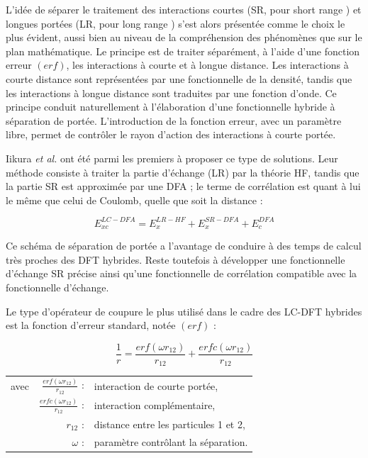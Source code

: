	L'idée de séparer le traitement des interactions courtes (SR, pour \og short range \fg{}) et longues portées (LR, pour \og long range \fg{}) s'est alors présentée comme le choix le plus évident, aussi bien au niveau de la compréhension des phénomènes que sur le plan mathématique. Le principe est de traiter séparément, à l'aide d'une fonction erreur $(erf)$, les interactions à courte et à longue distance. Les interactions à courte distance sont représentées par une fonctionnelle de la densité, tandis que les interactions à longue distance sont traduites par une fonction d'onde. Ce principe conduit naturellement à l'élaboration d'une fonctionnelle hybride à séparation de portée. L'introduction de la fonction erreur, avec un paramètre libre, permet de contrôler le rayon d'action des interactions à courte portée.
	
	Iikura \textit{et al.} \cite{iikura2001long} ont été parmi les premiers à proposer ce type de solutions. Leur méthode consiste à traiter la partie d'échange (LR) par la théorie HF, tandis que la partie SR est approximée par une DFA ; le terme de corrélation est quant à lui le même que celui de Coulomb, quelle que soit la distance :
	
	\begin{equation}
	E_{xc}^{LC-DFA} = E_{x}^{LR-HF} + E_{x}^{SR-DFA} + E_{c}^{DFA}
	\end{equation}
	
	Ce schéma de séparation de portée a l'avantage de conduire à des temps de calcul très proches des DFT hybrides. Reste toutefois à développer une fonctionnelle d'échange SR précise ainsi qu'une fonctionnelle de corrélation compatible avec la fonctionnelle d'échange.
	
	Le type d'opérateur de coupure le plus utilisé dans le cadre des LC-DFT hybrides est la fonction d'erreur standard, notée $(erf)$ :
	
	\begin{equation}
	\frac{1}{r} = \frac{erf(\omega r_{12})}{r_{12}} + \frac{erfc(\omega r_{12})}{r_{12}}
	\label{erf}
	\end{equation}
	
	\begin{flushleft}
		\begin{tabular}{@{}lrp{10cm}}
			avec & $\frac{erf(\omega r_{12})}{r_{12}}$ : & interaction de courte portée, \\
			& $\frac{erfc(\omega r_{12})}{r_{12}}$ : & interaction complémentaire, \\
			& $r_{12}$ : & distance entre les particules 1 et 2, \\
			& $\omega$ : & paramètre contrôlant la séparation.
		\end{tabular}
	\end{flushleft}
	
